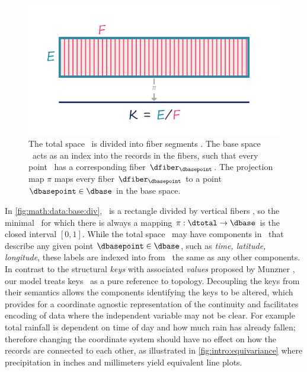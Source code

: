 \documentclass[../main.tex]{subfiles}
\begin{document}
\begin{figure}[H]
    \includegraphics[width=\linewidth]{figures/math/k_qspace.png}
    \caption{The total space \dtotal\ is divided into fiber segments \dfiber. The base space \dbase\ acts as an index into the records in the fibers, such that every point \dbasepoint\ has a corresponding fiber \(\dfiber_{\dbasepoint}\). The projection map \(\pi\) maps every fiber \(\dfiber_{\dbasepoint}\) to a point \(\dbasepoint \in \dbase\) in the base space.}
    \label{fig:math:data:base:div}
\end{figure}

In \autoref{fig:math:data:base:div}, \dtotal\ is a rectangle divided by vertical fibers \dfiber, so the minimal \dbase\ for which there is always a mapping \(\pi: \dtotal\rightarrow \dbase\) is the closed interval \(\left[0,1\right]\). While the total space \dtotal\ may have components in \dfiber\ that describe any given point \(\dbasepoint \in \dbase\), such as \textit{time, latitude, longitude}, these labels are indexed into from \dbase\ the same as any other components. In contrast to the structural \textit{keys} with associated \textit{values} proposed by Munzner \cite{munznerVisualizationAnalysisDesign2014}, our model treats keys \dbasepoint\ as a pure reference to topology. Decoupling the keys from their semantics allows the components identifying the keys to be altered, which provides for a coordinate agnostic representation of the continuity and facilitates encoding of data where the independent variable may not be clear. For example total rainfall is dependent on time of day and how much rain has already fallen; therefore changing the coordinate system should have no effect on how the records are connected to each other, as illustrated in \autoref{fig:intro:equivariance} where precipitation in inches and millimeters yield equivalent line plots. 
\end{document}
